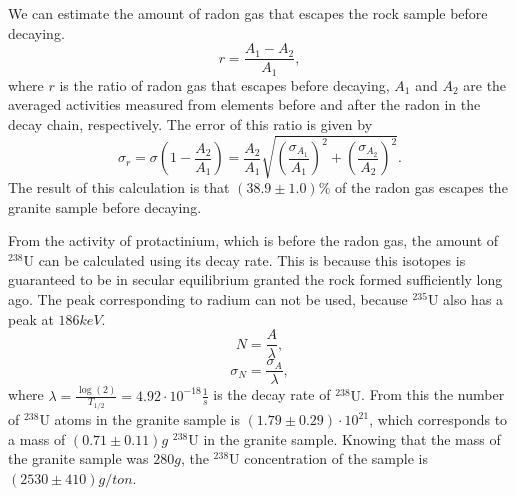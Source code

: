 \documentclass[pdftex,12pt,a4paper]{article}
\begin{document}
		We can estimate the amount of radon gas that escapes the rock sample before decaying.
		\begin{equation}
			r = \frac{A_1 - A_2}{A_1},
		\end{equation}
		where $r$ is the ratio of radon gas that escapes before decaying, $A_1$ and $A_2$ are the averaged activities measured from elements before and after the radon in the decay chain, respectively. The error of this ratio is given by
		\begin{equation}
			\sigma_r = \sigma\left(1 - \frac{A_2}{A_1}\right) = \frac{A_2}{A_1}\sqrt{\left(\frac{\sigma_{A_1}}{A_1}\right)^2 + \left(\frac{\sigma_{A_2}}{A_2}\right)^2}.
		\end{equation}
		The result of this calculation is that $(38.9\pm1.0)\%$ of the radon gas escapes the granite sample before decaying.
		
		From the activity of protactinium, which is before the radon gas, the amount of $^{238}\text{U}$ can be calculated using its decay rate. This is because this isotopes is guaranteed to be in secular equilibrium granted the rock formed sufficiently long ago. The peak corresponding to radium can not be used, because $^{235}\text{U}$ also has a peak at $186keV$.
		\begin{equation}
			N = \frac{A}{\lambda},
		\end{equation}
		\begin{equation}
			\sigma_N = \frac{\sigma_A}{\lambda},
		\end{equation}
		where $\lambda = \frac{\log(2)}{T_{1/2}} = 4.92\cdot 10^{-18}\frac{1}{s}$ is the decay rate of $^{238}\text{U}$. From this the number of $^{238}\text{U}$ atoms in the granite sample is $(1.79\pm0.29)\cdot 10^{21}$, which corresponds to a mass of $(0.71\pm0.11)g$ $^{238}\text{U}$ in the granite sample. Knowing that the mass of the granite sample was $280g$, the $^{238}\text{U}$ concentration of the sample is $(2530\pm410)g/ton$.
		
\end{document}
